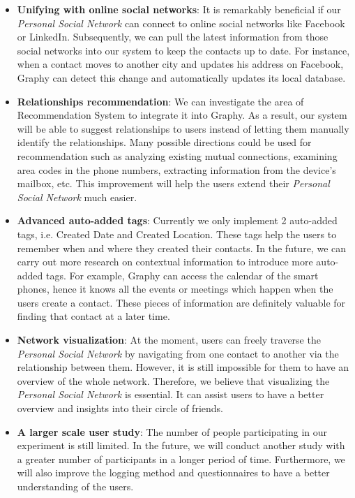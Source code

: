 \begin{itemize}
    \item {\textbf{Unifying with online social networks}: It is remarkably beneficial if our \textit{Personal Social Network} can connect to online social networks like Facebook or LinkedIn. Subsequently, we can pull the latest information from those social networks into our system to keep the contacts up to date. For instance, when a contact moves to another city and updates his address on Facebook, Graphy can detect this change and automatically updates its local database.}
    \item {\textbf{Relationships recommendation}: We can investigate the area of Recommendation System to integrate it into Graphy. As a result, our system will be able to suggest relationships to users instead of letting them manually identify the relationships. Many possible directions could be used for recommendation such as analyzing existing mutual connections, examining area codes in the phone numbers, extracting information from the device's mailbox, etc. This improvement will help the users extend their \textit{Personal Social Network} much easier.} 
    \item {\textbf{Advanced auto-added tags}: Currently we only implement 2 auto-added tags, i.e. Created Date and Created Location. These tags help the users to remember when and where they created their contacts. In the future, we can carry out more research on contextual information to introduce more auto-added tags. For example, Graphy can access the calendar of the smart phones, hence it knows all the events or meetings which happen when the users create a contact. These pieces of information are definitely valuable for finding that contact at a later time.}
    \item {\textbf{Network visualization}: At the moment, users can freely traverse the \textit{Personal Social Network} by navigating from one contact to another via the relationship between them. However, it is still impossible for them to have an overview of the whole network. Therefore, we believe that visualizing the \textit{Personal Social Network} is essential. It can assist users to have a better overview and insights into their circle of friends.}
    \item {\textbf{A larger scale user study}: The number of people participating in our experiment is still limited. In the future, we will conduct another study with a greater number of participants in a longer period of time. Furthermore, we will also improve the logging method and questionnaires to have a better understanding of the users.}

\end{itemize}


